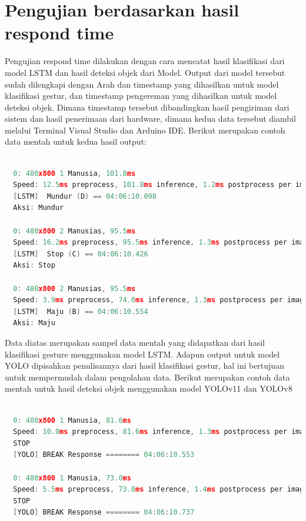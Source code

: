 \section{Pengujian berdasarkan hasil respond time}
Pengujian respond time dilakukan dengan cara mencatat hasil klasifikasi dari model LSTM dan hasil deteksi objek dari Model. Output dari model tersebut sudah dilengkapi dengan Arah dan timestamp yang dihasilkan untuk model klasifikasi gestur, dan timestamp pengereman yang dihasilkan untuk model deteksi objek. Dimana timestamp tersebut dibandingkan hasil pengiriman dari sistem dan hasil penerimaan dari hardware, dimana kedua data tersebut diambil melalui Terminal Visual Studio dan Arduino IDE. Berikut merupakan contoh data mentah untuk kedua hasil output: 

\begin{lstlisting}[language=c]
  
  0: 480x800 1 Manusia, 101.8ms
  Speed: 12.5ms preprocess, 101.8ms inference, 1.2ms postprocess per image at shape (1, 3, 480, 800)
  [LSTM]  Mundur (D) == 04:06:10.098
  Aksi: Mundur

  0: 480x800 2 Manusias, 95.5ms
  Speed: 16.2ms preprocess, 95.5ms inference, 1.3ms postprocess per image at shape (1, 3, 480, 800)
  [LSTM]  Stop (C) == 04:06:10.426
  Aksi: Stop

  0: 480x800 2 Manusias, 95.5ms
  Speed: 3.9ms preprocess, 74.0ms inference, 1.3ms postprocess per image at shape (1, 3, 480, 800)
  [LSTM]  Maju (B) == 04:06:10.554
  Aksi: Maju

\end{lstlisting}

Data diatas merupakan sampel data mentah yang didapatkan dari hasil klasifikasi gesture menggunakan model LSTM. Adapun output untuk model YOLO dipisahkan penulisannya dari hasil klasifikasi gestur, hal ini bertujuan untuk mempermudah dalam pengolahan data. Berikut merupakan contoh data mentah untuk hasil deteksi objek menggunakan model YOLOv11 dan YOLOv8

\begin{lstlisting}[language=c]
  
  0: 480x800 1 Manusia, 81.6ms
  Speed: 10.0ms preprocess, 81.6ms inference, 1.3ms postprocess per image at shape (1, 3, 480, 800)
  STOP
  [YOLO] BREAK Response ======== 04:06:10.553
  
  0: 480x800 1 Manusia, 73.0ms
  Speed: 5.5ms preprocess, 73.0ms inference, 1.4ms postprocess per image at shape (1, 3, 480, 800)
  STOP 
  [YOLO] BREAK Response ======== 04:06:10.737

\end{lstlisting}

